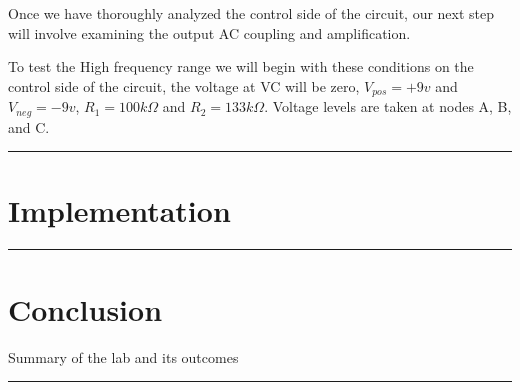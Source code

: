\documentclass{article}
\begin{document}
Once we have thoroughly analyzed the control side of the circuit, our next step will involve examining the output AC coupling and amplification.

To test the High frequency range we will begin with these conditions on the control side of the circuit, the voltage at VC will be zero, $V_{pos} = +9 v$ and $V_{neg} = -9 v$, $R_1 = 100k \Omega$ and $R_2 = 133k \Omega$. Voltage levels are taken at nodes A, B, and C.


\vspace{5mm}
\hrule


\section*{\textcolor{mycolor}{Implementation}}
\vspace{5mm}
\hrule

\section*{\textcolor{mycolor}{Conclusion}}
Summary of the lab and its outcomes
\vspace{5mm}
\hrule
\end{document}
